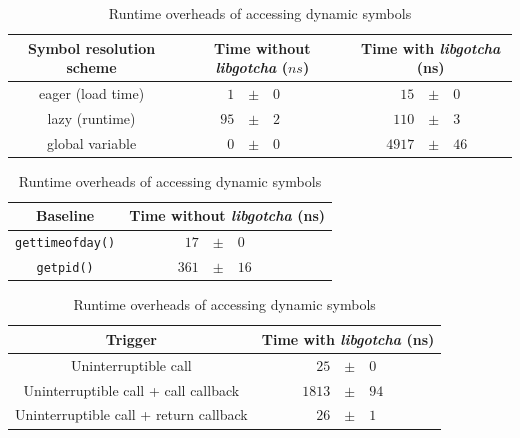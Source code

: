 \begin{table}
	\begin{minipage}{\textwidth}
	\centering
	\begin{tabular}{c | r l r l}
	Symbol resolution scheme & \multicolumn{2}{c}{Time without \textit{libgotcha} ($ns$)} & \multicolumn{2}{c}{Time with \textit{libgotcha} (ns)} \\
	\hline
	eager (load time) & \qquad $1$ & $\pm \quad 0$ & \qquad $15$ & $\pm \quad 0$ \\
	lazy (runtime) & $95$ & $\pm \quad 2$ & $110$ & $\pm \quad 3$ \\
	global variable & $0$ & $\pm \quad 0$ & $4917$ & $\pm \quad 46$
	\end{tabular}
	\label{tab:libgotcha:symb}
	\end{minipage}

	\begin{minipage}{\columnwidth}
	\vspace{12pt}
	\centering
	\begin{tabular}{c | r l}
	Baseline & \multicolumn{2}{c}{Time without \textit{libgotcha} (ns)} \\
	\hline
	\texttt{gettimeofday()} & \qquad $17$ & $\pm \quad 0$ \\
	\texttt{getpid()} & $361$ & $\pm \quad 16$
	\end{tabular}
	\label{tab:libgotcha:baseline}
	\end{minipage}

	\begin{minipage}{\columnwidth}
	\vspace{12pt}
	\centering
	\begin{tabular}{c | r l}
	Trigger & \multicolumn{2}{c}{Time with \textit{libgotcha} (ns)} \\
	\hline
	Uninterruptible call & \qquad $25$ & $\pm \quad 0$ \\
	Uninterruptible call + call callback & $1813$ & $\pm \quad 94$ \\
	Uninterruptible call + return callback & $26$ & $\pm \quad 1$
	\end{tabular}
	\label{tab:libgotcha:allowlist}
	\end{minipage}
\caption{Runtime overheads of accessing dynamic symbols}
\end{table}



